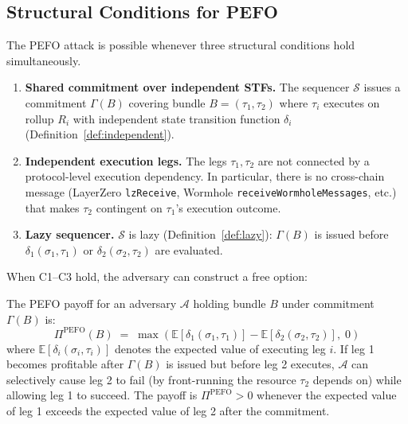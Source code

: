 \subsection{Structural Conditions for PEFO}
\label{sec:pefo-structural}

The PEFO attack is possible whenever three structural conditions hold
simultaneously.

\begin{enumerate}
  \item[\textbf{C1.}] \textbf{Shared commitment over independent STFs.}
    The sequencer $\mathcal{S}$ issues a commitment $\Gamma(B)$ covering
    bundle $B = (\tau_1, \tau_2)$ where $\tau_i$ executes on rollup $R_i$
    with independent state transition function $\delta_i$
    (Definition~\ref{def:independent}).

  \item[\textbf{C2.}] \textbf{Independent execution legs.}
    The legs $\tau_1, \tau_2$ are not connected by a protocol-level execution
    dependency. In particular, there is no cross-chain message (LayerZero
    \texttt{lzReceive}, Wormhole \texttt{receiveWormholeMessages}, etc.)
    that makes $\tau_2$ contingent on $\tau_1$'s execution outcome.

  \item[\textbf{C3.}] \textbf{Lazy sequencer.}
    $\mathcal{S}$ is lazy (Definition~\ref{def:lazy}): $\Gamma(B)$ is issued
    before $\delta_1(\sigma_1, \tau_1)$ or $\delta_2(\sigma_2, \tau_2)$ are
    evaluated.
\end{enumerate}

\noindent When C1--C3 hold, the adversary can construct a free option:

\begin{definition}
\label{def:pefo-payoff}
The PEFO payoff for an adversary $\mathcal{A}$ holding bundle $B$ under
commitment $\Gamma(B)$ is:
\[
  \Pi^{\mathrm{PEFO}}(B) \;=\; \max\!\left(
    \mathbb{E}[\delta_1(\sigma_1, \tau_1)]
    - \mathbb{E}[\delta_2(\sigma_2, \tau_2)],\; 0
  \right)
\]
where $\mathbb{E}[\delta_i(\sigma_i, \tau_i)]$ denotes the expected value
of executing leg $i$. If leg 1 becomes profitable after $\Gamma(B)$ is issued
but before leg 2 executes, $\mathcal{A}$ can selectively cause leg 2 to fail
(by front-running the resource $\tau_2$ depends on) while allowing leg 1 to
succeed. The payoff is $\Pi^{\mathrm{PEFO}} > 0$ whenever the expected value
of leg 1 exceeds the expected value of leg 2 after the commitment.
\end{definition}

